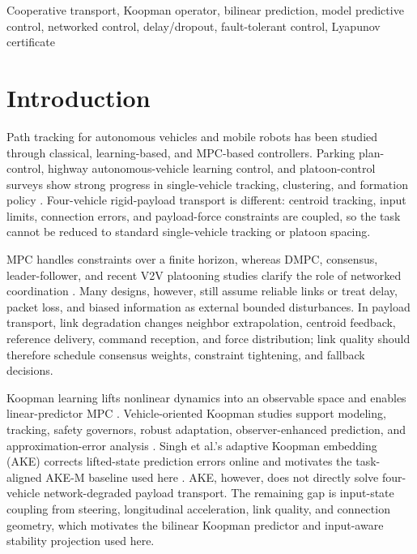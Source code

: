 \documentclass[letterpaper,journal]{IEEEtran}
\begin{document}
\begin{IEEEkeywords}
Cooperative transport, Koopman operator, bilinear prediction, model predictive control, networked control, delay/dropout, fault-tolerant control, Lyapunov certificate
\end{IEEEkeywords}

\section{Introduction}
Path tracking for autonomous vehicles and mobile robots has been studied through classical, learning-based, and MPC-based controllers. Parking plan-control, highway autonomous-vehicle learning control, and platoon-control surveys show strong progress in single-vehicle tracking, clustering, and formation policy \cite{irshayyid2024rlHighwayControl,nandhini2024platoonControlClustering,zeng2026unifiedParkingPlanControl}. Four-vehicle rigid-payload transport is different: centroid tracking, input limits, connection errors, and payload-force constraints are coupled, so the task cannot be reduced to standard single-vehicle tracking or platoon spacing.

MPC handles constraints over a finite horizon, whereas DMPC, consensus, leader-follower, and recent V2V platooning studies clarify the role of networked coordination \cite{zhang2025opticalV2VPlatooning}. Many designs, however, still assume reliable links or treat delay, packet loss, and biased information as external bounded disturbances. In payload transport, link degradation changes neighbor extrapolation, centroid feedback, reference delivery, command reception, and force distribution; link quality should therefore schedule consensus weights, constraint tightening, and fallback decisions.

Koopman learning lifts nonlinear dynamics into an observable space and enables linear-predictor MPC \cite{brunton2016koopmanControl,korda2018koopmanMpc}. Vehicle-oriented Koopman studies support modeling, tracking, safety governors, robust adaptation, observer-enhanced prediction, and approximation-error analysis \cite{xiao2022deepKoopmanVehicle,joglekar2023koopmanExperimental,kim2025ksmpc,chen2024koopmanSafetyGovernor,wang2026deepKoopmanRobustTracking,zhang2025physicsInformedAdaptiveKoopman,chen2024esoDeepKoopman,philipp2023koopmanErrorBounds,cibulka2021koopmanVehicleMpc}. Singh et al.'s adaptive Koopman embedding (AKE) corrects lifted-state prediction errors online and motivates the task-aligned AKE-M baseline used here \cite{singh2025adaptiveKoopman}. AKE, however, does not directly solve four-vehicle network-degraded payload transport. The remaining gap is input-state coupling from steering, longitudinal acceleration, link quality, and connection geometry, which motivates the bilinear Koopman predictor and input-aware stability projection used here.
\end{document}
